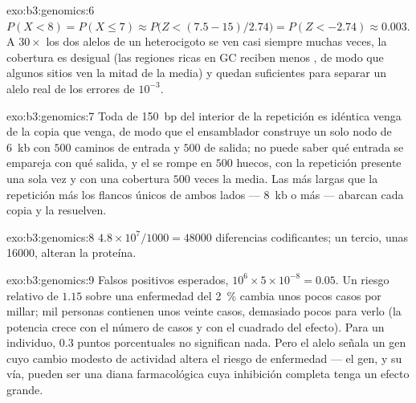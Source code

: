\begin{solution}{exo:b3:genomics:6}
$P(X < 8) = P(X \le 7) \approx P\bigl(Z < (7.5 - 15)/2.74\bigr) =
P(Z < -2.74) \approx 0.003$. A $30\times$ los dos alelos de un
heterocigoto se ven casi siempre muchas veces, la cobertura es desigual
(las regiones ricas en GC reciben menos , de modo que algunos
sitios ven la mitad de la media) y quedan  suficientes para
separar un alelo real de los errores de $10^{-3}$.
\end{solution}

\begin{solution}{exo:b3:genomics:7}
Toda  de \qty{150}{bp} del interior de la repetición es idéntica
venga de la copia que venga, de modo que el ensamblador construye un solo
nodo de \qty{6}{kb} con $500$ caminos de entrada y $500$ de salida; no
puede saber qué entrada se empareja con qué salida, y el  se
rompe en $500$ huecos, con la repetición presente una sola vez y con una
cobertura $500$ veces la media. Las  más largas que la repetición
más los flancos únicos de ambos lados --- \qty{8}{kb} o más --- abarcan
cada copia y la resuelven.
\end{solution}

\begin{solution}{exo:b3:genomics:8}
$4.8\times 10^{7}/1000 = \num{48000}$ diferencias codificantes; un
tercio, unas \num{16000}, alteran la proteína.
\end{solution}

\begin{solution}{exo:b3:genomics:9}
Falsos positivos esperados, $10^{6}\times 5\times 10^{-8} = 0.05$. Un
riesgo relativo de $1.15$ sobre una enfermedad del \qty{2}{\%} cambia
unos pocos casos por millar; mil personas contienen unos veinte casos,
demasiado pocos para verlo (la potencia crece con el número de casos y
con el cuadrado del efecto). Para un individuo, $0.3$ puntos porcentuales
no significan nada. Pero el alelo señala un gen cuyo cambio modesto de
actividad altera el riesgo de enfermedad --- el gen, y su vía, pueden ser
una diana farmacológica cuya inhibición completa tenga un efecto grande.
\end{solution}

